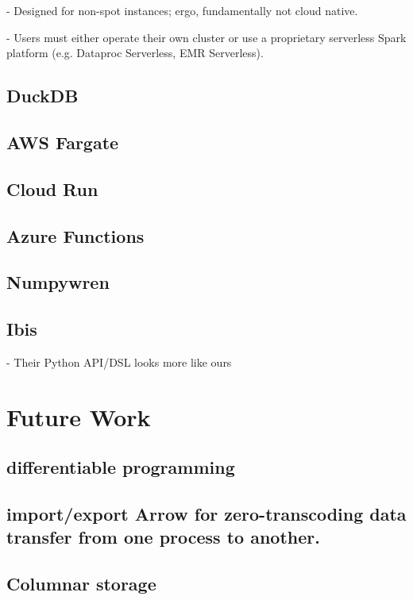 \documentclass[10pt,a4paper%
]{article}
\begin{document}
    - Designed for non-spot instances; ergo, fundamentally not cloud native.

    - Users must either operate their own cluster or use a proprietary serverless Spark platform (e.g. Dataproc Serverless, EMR Serverless).

\subsection{DuckDB}

\subsection{AWS Fargate}

\subsection{Cloud Run}

\subsection{Azure Functions}

\subsection{Numpywren}

\subsection{Ibis}

    - Their Python API/DSL looks more like ours

\section{Future Work}

\subsection{differentiable programming}

\subsection{import/export Arrow for zero-transcoding data transfer from one process to another.}

\subsection{Columnar storage}
\end{document}
